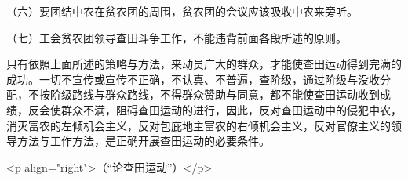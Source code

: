 （六）要团结中农在贫农团的周围，贫农团的会议应该吸收中农来旁听。

（七）工会贫农团领导查田斗争工作，不能违背前面各段所述的原则。

只有依照上面所述的策略与方法，来动员广大的群众，才能使查田运动得到完满的成功。一切不宣传或宣传不正确，不认真、不普遍，查阶级，通过阶级与没收分配，不按阶级路线与群众路线，不得群众赞助与同意，都不能使查田运动收到成绩，反会使群众不满，阻碍查田运动的进行，因此，反对查田运动中的侵犯中农，消灭富农的左倾机会主义，反对包庇地主富农的右倾机会主义，反对官僚主义的领导方法与工作方法，是正确开展查田运动的必要条件。

<p align="right">（“论查田运动”）</p>

